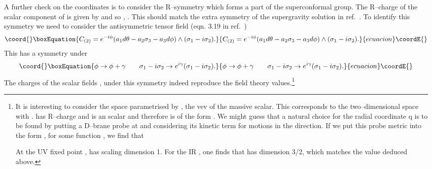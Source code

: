 \documentclass[a4paper,12pt]{article}
\begin{document}
A further check on the coordinates is to consider the \coordHE{}
R--symmetry which forms a part of the superconformal group. The
R--charge of the scalar component of \coordHE{} is given by \coordHE{} and so \coordHE{}, \coordHE{} . This
should match the extra \coordHE{} symmetry of the supergravity solution in
ref.~\cite{pw2}. To identify this \coordHE{} symmetry we need to consider
the antisymmetric tensor field (eqn.  3.19 in ref.~\cite{pw2})
\begin{equation}\coord{}\boxEquation{
C_{(2)} = e^{-i \phi} (a_1 d\theta - a_2 \sigma_3 - a_3 d\phi) \wedge (\sigma_1 - i \sigma_2) .
}{
C_{(2)} = e^{-i \phi} (a_1 d\theta - a_2 \sigma_3 - a_3 d\phi) \wedge (\sigma_1 - i \sigma_2) .
}{ecuacion}\coordE{}\end{equation}
This has a \coordHE{} symmetry under 
\begin{equation}\coord{}\boxEquation{
  \phi  \rightarrow \phi + \gamma  \qquad \sigma_1 - i \sigma_2 \rightarrow e^{i \gamma} ( \sigma_1 - i \sigma_2) . 
}{
  \phi  \rightarrow \phi + \gamma  \qquad \sigma_1 - i \sigma_2 \rightarrow e^{i \gamma} ( \sigma_1 - i \sigma_2) . 
}{ecuacion}\coordE{}\end{equation}
The charges of the scalar fields \coordHE{}, \coordHE{} under this symmetry
indeed reproduce the field theory values.\footnote{It is interesting
  to consider the space \coordHE{} parametrised by \coordHE{}, the vev
  of the massive scalar. This corresponds to the two--dimensional
  space with \coordHE{}.  \coordHE{} has R--charge \coordHE{} and is
  an \coordHE{} scalar and therefore is of the form \coordHE{}. We might guess that a natural choice for the radial
  coordinate q is to be found by putting a D--brane probe at \coordHE{} and considering its kinetic term for motions in the \coordHE{}
  direction.  If we put this probe metric into the form \coordHE{}, for some function \coordHE{}, we find that

  \coordHE{}
%
At the UV fixed point \coordHE{}, \coordHE{} has scaling dimension 1.
For the IR \coordHE{}, one finds that \coordHE{} has dimension 3/2,
which matches the value deduced above.}
\end{document}

